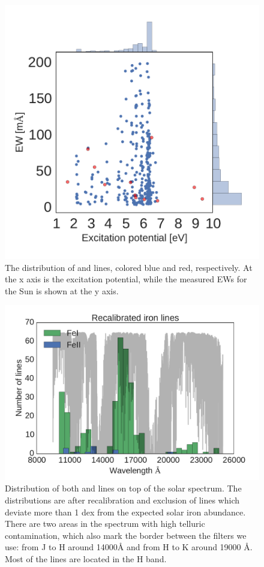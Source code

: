 \documentclass{aa}
\begin{document}
\begin{figure}[tpb]
    \centering
    \includegraphics[width=1.0\linewidth]{figures/EWvsEP.pdf}
    \caption{The distribution of  and  lines,
    colored blue and red, respectively. At the x axis is
    the excitation potential, while the measured EWs for the Sun is
    shown at the y axis.}
    \label{fig:Fe1_before_recal}
\end{figure}


\begin{figure}[tpb]
    \centering
    \includegraphics[width=1.05\linewidth]{figures/EWvsEP_cut.pdf}
    \caption{Distribution of both  and  lines on top of the solar
    spectrum. The distributions are after recalibration and exclusion
    of lines which deviate more than 1 dex from the expected solar iron
    abundance. There are two areas in the spectrum with high telluric
    contamination, which also mark the border between the filters we
    use: from J to H around 14000\si{\angstrom} and from H to K around
    19000 \si{\angstrom}. Most of the lines are located in the H band.}
    \label{fig:Fe1_after_recal}
\end{figure}
\end{document}
